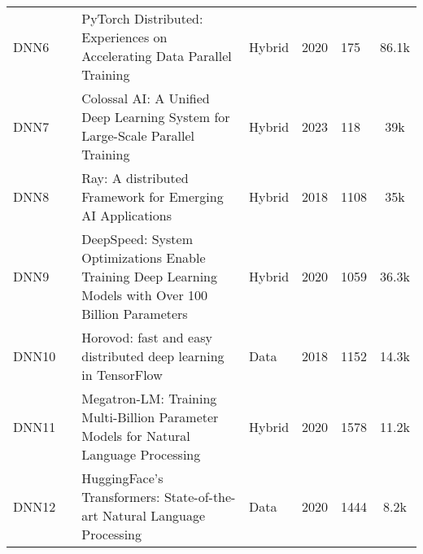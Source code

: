 \begin{table*}[th!]
\begin{tabular}{llp{8.4cm}lllc}
		\small DNN6        & \small \cite{li_pytorch_2020}           & \small PyTorch Distributed: Experiences on Accelerating Data Parallel Training                                                      & \small Hybrid        & \small 2020          & \small 175                & \small 86.1k \cite{noauthor_pytorchpytorch_nodate}                   \\[1ex]
		\small DNN7        & \small \cite{li_colossal-ai_2023}       & \small Colossal AI: A Unified Deep Learning System for Large-Scale Parallel Training                                                & \small Hybrid        & \small 2023          & \small 118                & \small 39k \cite{noauthor_hpcaitechcolossalai_2025}                  \\[1ex]
		\small DNN8        & \small \cite{moritz_ray_2018}           & \small Ray: A distributed Framework for Emerging AI Applications                                                                    & \small Hybrid        & \small 2018          & \small 1108               & \small 35k \cite{noauthor_ray-projectray_2025}                       \\[1ex]
		\small DNN9        & \small \cite{rasley_deepspeed_2020}     & \small DeepSpeed: System Optimizations Enable Training Deep Learning Models with Over 100 Billion Parameters                        & \small Hybrid        & \small 2020          & \small 1059               & \small 36.3k \cite{noauthor_microsoftdeepspeed_2025}                 \\[1ex]
		\small DNN10       & \small \cite{sergeev_horovod_2018}      & \small Horovod: fast and easy distributed deep learning in TensorFlow                                                               & \small Data          & \small 2018          & \small 1152               & \small 14.3k \cite{noauthor_horovodhorovod_2025}                     \\[1ex]
		\small DNN11       & \small \cite{shoeybi_megatron-lm_2020}  & \small Megatron-LM: Training Multi-Billion Parameter Models for Natural Language Processing                                         & \small Hybrid        & \small 2020          & \small 1578               & \small 11.2k \cite{noauthor_nvidiamegatron-lm_2025}                  \\[1ex]
		\small DNN12       & \small \cite{wolf_huggingfaces_2020}    & \small HuggingFace's Transformers: State-of-the-art Natural Language Processing                                                     & \small Data          & \small 2020          & \small 1444               & \small 8.2k \cite{noauthor_huggingfaceaccelerate_2025}               \\[1ex]

\end{tabular}
\end{table*}
